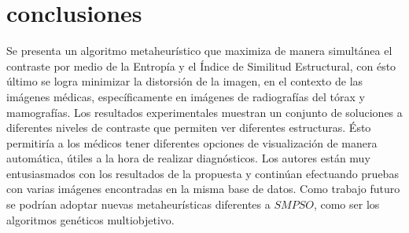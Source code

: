 \documentclass[spanish,twocolumn]{article}
\begin{document}
{\section{conclusiones}
\label{sec:conclusion}
Se presenta un algoritmo metaheurístico que maximiza de manera simultánea el contraste por medio de la Entropía y el Índice de Similitud Estructural, con ésto último se logra minimizar la distorsión de la imagen, en el contexto de las imágenes médicas, específicamente en imágenes de radiografías del tórax y mamografías. Los resultados experimentales muestran un conjunto de soluciones a diferentes niveles de contraste que permiten ver diferentes estructuras. Ésto permitiría a los médicos tener diferentes opciones de visualización de manera automática, útiles a la hora de realizar diagnósticos.
Los autores están muy entusiasmados con los resultados de la propuesta y continúan efectuando pruebas con varias imágenes encontradas en la misma base de datos. Como trabajo futuro se podrían adoptar nuevas metaheurísticas diferentes a $SMPSO$, como ser los algoritmos genéticos multiobjetivo.




%
%
%


}
\end{document}

